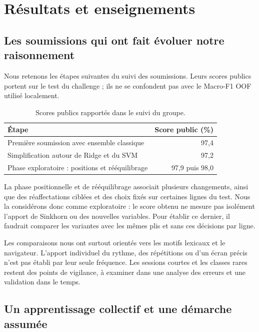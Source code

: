 \documentclass{rapportECL}
\begin{document}
\section{Résultats et enseignements}

\subsection{Les soumissions qui ont fait évoluer notre raisonnement}

Nous retenons les étapes suivantes du suivi des soumissions. Leurs scores publics portent sur le test du challenge ; ils ne se confondent pas avec le Macro-F1 OOF utilisé localement.

\begin{table}[!htbp]
\centering\small
\begin{tabular}{lr}
\hline
Étape & Score public (\%) \\
\hline
Première soumission avec ensemble classique & 97,4 \\
Simplification autour de Ridge et du SVM & 97,2 \\
Phase exploratoire : positions et rééquilibrage & 97,9 puis 98,0 \\
\hline
\end{tabular}
\caption{Scores publics rapportés dans le suivi du groupe.}
\end{table}

La phase positionnelle et de rééquilibrage associait plusieurs changements, ainsi que des réaffectations ciblées et des choix fixés sur certaines lignes du test. Nous la considérons donc comme exploratoire : le score obtenu ne mesure pas isolément l'apport de Sinkhorn ou des nouvelles variables. Pour établir ce dernier, il faudrait comparer les variantes avec les mêmes plis et sans ces décisions par ligne.

Les comparaisons nous ont surtout orientés vers les motifs lexicaux et le navigateur. L'apport individuel du rythme, des répétitions ou d'un écran précis n'est pas établi par leur seule fréquence. Les sessions courtes et les classes rares restent des points de vigilance, à examiner dans une analyse des erreurs et une validation dans le temps.

\subsection{Un apprentissage collectif et une démarche assumée}
\end{document}
